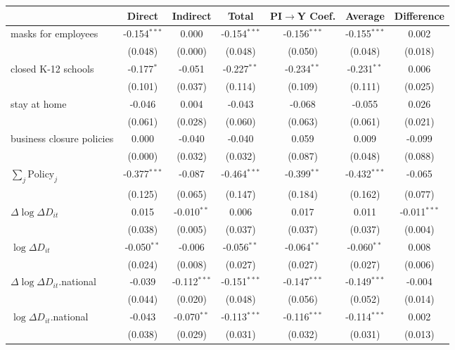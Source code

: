 
\begin{tabular}{lccccc|>{}c}
\toprule
  & Direct & Indirect & Total & PI$\to$Y Coef. & Average & Difference\\
\midrule
masks for employees & -0.154$^{***}$ & 0.000 & -0.154$^{***}$ & -0.156$^{***}$ & -0.155$^{***}$ & 0.002\\
 & (0.048) & (0.000) & (0.048) & (0.050) & (0.048) & (0.018)\\
closed K-12 schools & -0.177$^{*}$ & -0.051 & -0.227$^{**}$ & -0.234$^{**}$ & -0.231$^{**}$ & 0.006\\
 & (0.101) & (0.037) & (0.114) & (0.109) & (0.111) & (0.025)\\
stay at home & -0.046 & 0.004 & -0.043 & -0.068 & -0.055 & 0.026\\
 & (0.061) & (0.028) & (0.060) & (0.063) & (0.061) & (0.021)\\
business closure policies & 0.000 & -0.040 & -0.040 & 0.059 & 0.009 & -0.099\\
 & (0.000) & (0.032) & (0.032) & (0.087) & (0.048) & (0.088)\\
$\sum_j \mathrm{Policy}_j$ & -0.377$^{***}$ & -0.087 & -0.464$^{***}$ & -0.399$^{**}$ & -0.432$^{***}$ & -0.065\\
 & (0.125) & (0.065) & (0.147) & (0.184) & (0.162) & (0.077)\\
$\Delta \log \Delta D_{it}$ & 0.015 & -0.010$^{**}$ & 0.006 & 0.017 & 0.011 & -0.011$^{***}$\\
 & (0.038) & (0.005) & (0.037) & (0.037) & (0.037) & (0.004)\\
$\log \Delta D_{it}$ & -0.050$^{**}$ & -0.006 & -0.056$^{**}$ & -0.064$^{**}$ & -0.060$^{**}$ & 0.008\\
 & (0.024) & (0.008) & (0.027) & (0.027) & (0.027) & (0.006)\\
$\Delta \log \Delta D_{it}$.national & -0.039 & -0.112$^{***}$ & -0.151$^{***}$ & -0.147$^{***}$ & -0.149$^{***}$ & -0.004\\
 & (0.044) & (0.020) & (0.048) & (0.056) & (0.052) & (0.014)\\
$\log \Delta D_{it}$.national & -0.043 & -0.070$^{**}$ & -0.113$^{***}$ & -0.116$^{***}$ & -0.114$^{***}$ & 0.002\\
 & (0.038) & (0.029) & (0.031) & (0.032) & (0.031) & (0.013)\\
\bottomrule
\end{tabular}